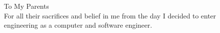 \begin{dedication}
{\large{To My Parents}}\\[5mm]
For all their sacrifices and belief in me from the day I decided to enter engineering as a computer and software engineer.
\end{dedication}


